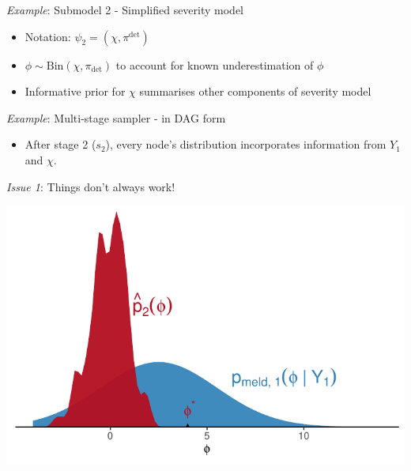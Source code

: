 \documentclass[10pt,ignorenonframetext,]{beamer}
\providecommand{\tightlist}{%
  \setlength{\itemsep}{0pt}\setlength{\parskip}{0pt}}
\begin{document}
\begin{frame}{\emph{Example}: Submodel 2 - Simplified severity model}



\begin{itemize}
\tightlist
\item
  Notation: \(\psi_{2} = (\chi, \pi^{\text{det}})\)
\item
  \(\phi \sim \text{Bin}(\chi, \pi_{\text{det}})\) to account for known
  underestimation of \(\phi\)
\item
  Informative prior for \(\chi\) summarises other components of severity
  model
\end{itemize}

\end{frame}

\begin{frame}{\emph{Example}: Multi-stage sampler - in DAG form}



\begin{itemize}
\tightlist
\item
  After stage 2 (\(s_{2}\)), every node's distribution incorporates
  information from \(Y_{1}\) and \(\chi\).
\end{itemize}

\end{frame}

\begin{frame}{\emph{Issue 1}: Things don't always work!}



\begin{center}\includegraphics[width=0.85\linewidth]{figures/conflict} \end{center}

\end{frame}
\end{document}
